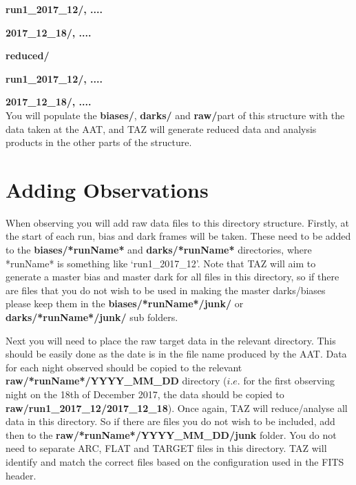 \documentclass[12pt]{article}
\begin{document}
\hspace{15mm} \textbf{run1\_2017\_12/, ....} 
\vspace{1mm}

\hspace{30mm} \textbf{2017\_12\_18/, ....} 
\vspace{1mm}

\hspace{10mm} \textbf{reduced/}
\vspace{1mm}

\hspace{15mm} \textbf{run1\_2017\_12/, ....} 
\vspace{1mm}

\hspace{30mm} \textbf{2017\_12\_18/, ....} \\

You will populate the \textbf{biases/}, \textbf{darks/} and \textbf{raw/}part of this structure with the data taken at the AAT, and TAZ will generate reduced data and analysis products in the other parts of the structure.  


\section{Adding Observations}

When observing you will add raw data files to this directory structure. Firstly, at the start of each run, bias and dark frames will be taken. These need to be added to the \textbf{biases/*runName*} and \textbf{darks/*runName*} directories, where *runName* is something like `run1\_2017\_12'. Note that TAZ will aim to generate a master bias and master dark for all files in this directory, so if there are files that you do not wish to be used in making the master darks/biases please keep them in the  \textbf{biases/*runName*/junk/} or \textbf{darks/*runName*/junk/} sub folders.

Next you will need to place the raw target data in the relevant directory. This should be easily done as the date is in the file name produced by the AAT. Data for each night observed should be copied to the relevant \textbf{raw/*runName*/YYYY\_MM\_DD} directory ($i.e.$ for the first observing night on the 18th of December 2017, the data should be copied to \textbf{raw/run1\_2017\_12/2017\_12\_18}). Once again, TAZ will reduce/analyse all data in this directory. So if there are files you do not wish to be included, add then to the \textbf{raw/*runName*/YYYY\_MM\_DD/junk} folder. You do not need to separate ARC, FLAT and TARGET files in this directory. TAZ will identify and match the correct files based on the configuration used in the FITS header.  
\end{document}

